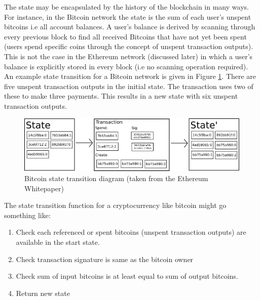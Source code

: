 The state may be encapsulated by the history of the blockchain in many ways. For instance, in the Bitcoin network the state is the sum of each user's unspent bitcoins i.e all account balances. A user's balance is derived by scanning through every previous block to find all received Bitcoins that have not yet been spent (users spend specific coins through the concept of unspent transaction outputs). This is not the case in the Ethereum network (discussed later) in which a user's balance is explicitly stored in every block (i.e no scanning operation required). An example state transition for a Bitcoin network is given in Figure \ref{fig:bitcoin_transition}. There are five unspent transaction outputs in the initial state. The transaction uses two of these to make three payments. This results in a new state with six unspent transaction outputs. \\

\begin{figure}
\centering
\includegraphics[width=1.4\textwidth]{Figures/state_transition}
\decoRule
\caption[Bitcoin State Transition]{Bitcoin state transition diagram (taken from the Ethereum Whitepaper\cite{Ethereum})}
\label{fig:bitcoin_transition}
\end{figure}

The state transition function for a cryptocurrency like bitcoin might go something like:
\begin{enumerate}
\item Check each referenced or spent bitcoins (unspent transaction outputs) are available in the start state.
\item Check transaction signature is same as the bitcoin owner
\item Check sum of input bitcoins is at least equal to sum of output bitcoins.
\item Return new state 
\end{enumerate}

